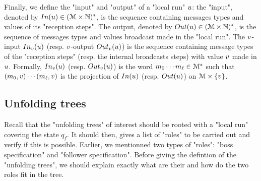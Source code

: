 	Finally, we define the "input" and "output" of a "local run" $u$: the "input", denoted by $\Input{\localrun} \in (\messages \times \nats)^*$, is the sequence containing messages types and values of its "reception steps". The output, denoted by $\Output{\localrun} \in (\messages \times \nats)^*$, is the sequence of messages types and values broadcast made in the "local run". The $v$-input $\vinput{\aval}{\localrun} $ (resp. $v$-output $\voutput{\aval}{\localrun}$) is the sequence containing message types of the "reception steps" (resp. the internal broadcasts steps) with value $v$ made in $u$. Formally, $\vinput{\aval}{\localrun}$ (resp. $\voutput{\aval}{\localrun}$) is the word $m_0 \cdots m_{\ell} \in \mathcal{M}^*$ such that $(m_0, v) \cdots (m_{\ell}, v)$ is the projection of $\Input{\localrun}$ (resp. $\Output{\localrun}$) on $\mathcal{M} \times \{v\}$. 
%	


\subsection{Unfolding trees}
\label{sec:decidability-tree-unfoldings}





Recall that the "unfolding trees" of interest should be rooted with a "local run" covering the state $q_f$. It should then, gives a list of "roles" to be carried out and verify if this is possible. Earlier, we mentionned two types of "roles": "boss specification" and "follower specification".
Before giving the defintion of the "unfolding trees", we should explain exactly what are their and how do the two roles fit in the tree.


